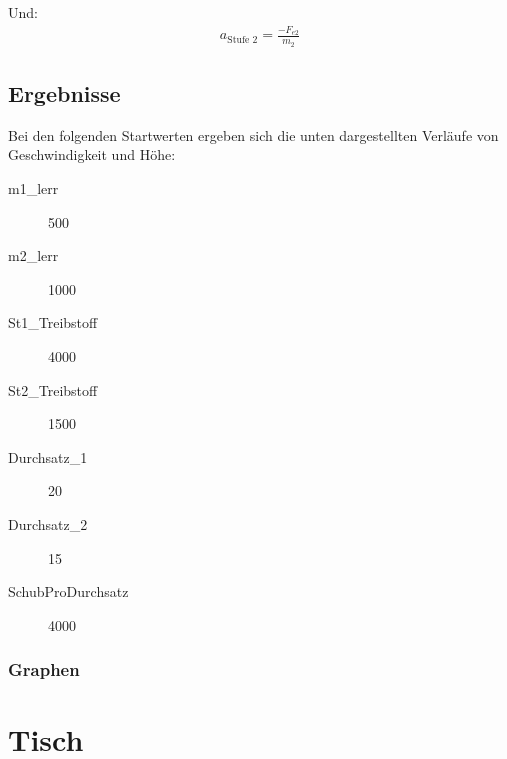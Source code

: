 \documentclass[10pt]{scrartcl}
\begin{document}
	Und:
	\begin{align}
	a_{\text{Stufe 2}} = \frac{- F_{e2}}{m_2}
	\end{align}	

	\subsection{Ergebnisse}
	Bei den folgenden Startwerten ergeben sich die unten dargestellten Verläufe von Geschwindigkeit und Höhe:
	\begin{description}
		\item[m1\_lerr] 500
		\item[m2\_lerr] 1000
		\item[St1\_Treibstoff] 4000
		\item[St2\_Treibstoff] 1500
		\item[Durchsatz\_1] 20
		\item[Durchsatz\_2] 15
		\item[SchubProDurchsatz] 4000
	\end{description}
	
	\subsubsection{Graphen}	
	
	
\section{Tisch}	
		
\end{document}
